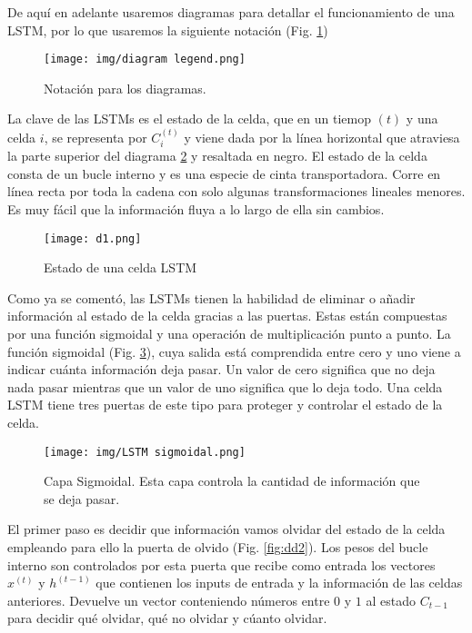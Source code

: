     De aquí en adelante usaremos diagramas para detallar el funcionamiento de una LSTM, por lo que usaremos la siguiente notación (Fig. \ref{fig:LSTM legend}) \\
    
    \begin{figure}[H]
        \centering
        \texttt{[image: img/diagram legend.png]}
        \caption{Notación para los diagramas.}
        \label{fig:LSTM legend}
    \end{figure}
    
    La clave de las LSTMs es el estado de la celda, que en un tiemop $(t)$ y una celda $i$, se representa por $C_i^{(t)}$ y viene dada por la línea horizontal que atraviesa la parte superior del diagrama \ref{fig:LSTM estado} y resaltada en negro. El estado de la celda consta de un bucle interno y es una especie de cinta transportadora. Corre en línea recta por toda la cadena con solo algunas transformaciones lineales menores. Es muy fácil que la información fluya a lo largo de ella sin cambios. \\
    
    	 \begin{figure}[H]
	        \centering
	        \texttt{[image: d1.png]}
	        \caption{Estado de una celda LSTM}
	        \label{fig:LSTM estado}
	    \end{figure}
	    
	 Como ya se comentó, las LSTMs tienen la habilidad de eliminar o añadir información al estado de la celda gracias a las puertas. Estas están compuestas por una función sigmoidal y una operación de multiplicación punto a punto. La función sigmoidal (Fig. \ref{fig:LSTM sigmoidal}), cuya salida está comprendida entre cero y uno viene a indicar cuánta información deja pasar. Un valor de cero significa que no deja nada pasar mientras que un valor de uno significa que lo deja todo. Una celda LSTM tiene tres puertas de este tipo para proteger y controlar el estado de la celda. \\ 
	 
	 \begin{figure}[H]
	     \centering
	     \texttt{[image: img/LSTM sigmoidal.png]}
	     \caption{Capa Sigmoidal. Esta capa controla la cantidad de información que se deja pasar.}
	     \label{fig:LSTM sigmoidal}
	 \end{figure}
	    
	     
	 El primer paso es decidir que información vamos olvidar del estado de la celda empleando para ello la puerta de olvido (Fig. \ref{fig:dd2}). Los pesos del bucle interno son controlados por esta puerta que recibe como entrada los vectores $x^{(t)}$ y $h^{(t-1)}$ que contienen los inputs de entrada y la información de las celdas anteriores. Devuelve un vector conteniendo números entre $0$ y $1$ al estado $C_{t-1}$ para decidir qué olvidar, qué no olvidar y cúanto olvidar. \\
	    
